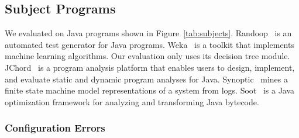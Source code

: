 

\subsection{Subject Programs}


We evaluated \ourtool on \subjectnum Java programs shown
in Figure~\ref{tab:subjects}.
Randoop~\cite{PachecoLET2007} is an automated test generator
for Java programs. Weka~\cite{weka} is a toolkit that implements
machine learning algorithms. Our evaluation
only uses its decision tree module. JChord~\cite{jchord}
is a program analysis platform that enables users to design, implement,
and evaluate static and dynamic program analyses for Java.
Synoptic~\cite{Beschastnikh:2011} mines a finite state machine
model representations of a system from logs.
Soot~\cite{soot} is a Java optimization framework for analyzing and transforming Java bytecode.


\subsubsection{Configuration Errors}

